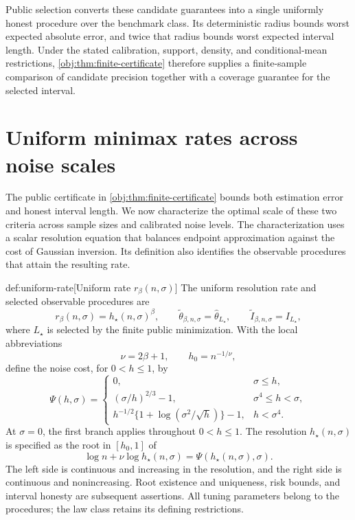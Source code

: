 \documentclass[11pt]{article}
\begin{document}
Public selection converts these candidate guarantees into a single uniformly honest procedure over the benchmark class. Its deterministic radius bounds worst expected absolute error, and twice that radius bounds worst expected interval length. Under the stated calibration, support, density, and conditional-mean restrictions, \cref{obj:thm:finite-certificate} therefore supplies a finite-sample comparison of candidate precision together with a coverage guarantee for the selected interval.


\section{Uniform minimax rates across noise scales}

The public certificate in \cref{obj:thm:finite-certificate} bounds both estimation error and honest interval length. We now characterize the optimal scale of these two criteria across sample sizes and calibrated noise levels. The characterization uses a scalar resolution equation that balances endpoint approximation against the cost of Gaussian inversion. Its definition also identifies the observable procedures that attain the resulting rate.

\begin{definitionv}{def:uniform-rate}[Uniform rate \(r_\beta(n,\sigma)\)]
The uniform resolution rate and selected observable procedures are
\[
r_\beta(n,\sigma)=h_\star(n,\sigma)^\beta,
\qquad
\widetilde\theta_{\beta,n,\sigma}=\widehat\theta_{L_\star},
\qquad
\widetilde I_{\beta,n,\sigma}=I_{L_\star},
\]
where \(L_\star\) is selected by the finite public minimization. With the local abbreviations
\[
\nu=2\beta+1,\qquad h_0=n^{-1/\nu},
\]
define the noise cost, for \(0<h\le1\), by
\[
\Psi(h,\sigma)=
\begin{cases}
0,&\sigma\le h,\\
(\sigma/h)^{2/3}-1,&\sigma^4\le h<\sigma,\\
h^{-1/2}\{1+\log(\sigma^2/\sqrt h)\}-1,&h<\sigma^4.
\end{cases}
\]
At \(\sigma=0\), the first branch applies throughout \(0<h\le1\). The resolution \(h_\star(n,\sigma)\) is specified as the root in \([h_0,1]\) of
\[
\log n+\nu\log h_\star(n,\sigma)
=\Psi(h_\star(n,\sigma),\sigma).
\]
The left side is continuous and increasing in the resolution, and the right side is continuous and nonincreasing. Root existence and uniqueness, risk bounds, and interval honesty are subsequent assertions. All tuning parameters belong to the procedures; the law class retains its defining restrictions.
\end{definitionv}
\end{document}
